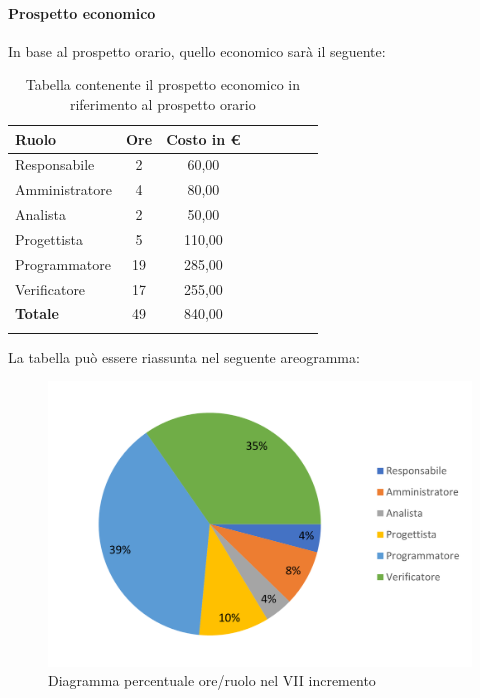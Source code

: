 \paragraph{Prospetto economico}
In base al prospetto orario, quello economico sarà il seguente:

\begin{longtable}{|l|c|c|c|c|c|c|c|}
	\hline
	\rowcolor{lighter-grayer}
	\textbf{Ruolo}  & \textbf{Ore} & \textbf{Costo in €} \\
	\hline
	\endfirsthead

	\hline
	Responsabile    & 2            & 60,00              \\
	\hline
	\hline
	Amministratore  & 4            & 80,00               \\
	\hline
	\hline
	Analista        & 2           & 50,00              \\
	\hline
	\hline
	Progettista     & 5            & 110,00                   \\
	\hline
	\hline
	Programmatore   & 19            & 285,00                   \\
	\hline
	\hline
	Verificatore    & 17           & 255,00              \\
	\hline
	\textbf{Totale} & 49           & 840,00            \\
	\hline
	\rowcolor{white}
	\caption{Tabella contenente il prospetto economico in riferimento al prospetto orario}
\end{longtable}
\pagebreak

La tabella può essere riassunta nel seguente areogramma:
\begin{figure}[H]
	\centering
	\includegraphics[width=0.8\linewidth]{res/images/preventivo/dettaglio_implementazione/4-2.png}
	\caption{Diagramma percentuale ore/ruolo nel VII incremento}
	\label{fig:diagramma costi ruolo VII incremento}
\end{figure}

